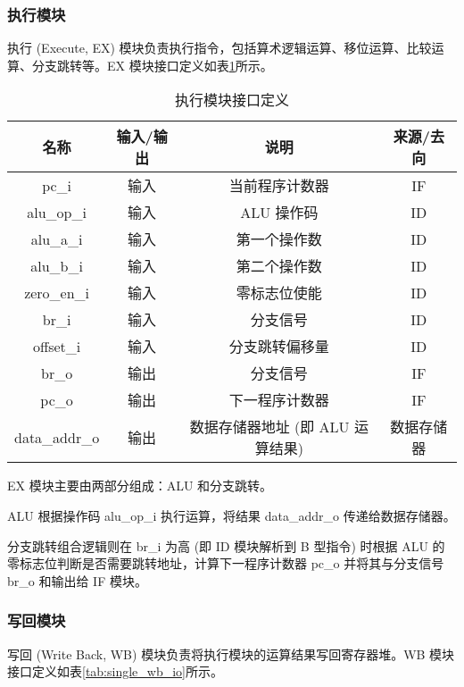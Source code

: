 \documentclass[lang=zh]{sjtuarticle}	%
\begin{document}
\subsubsection{执行模块}

执行 (Execute, EX) 模块负责执行指令，包括算术逻辑运算、移位运算、比较运算、分支跳转等。EX 模块接口定义如表\ref{tab:single_ex_io}所示。	

\begin{table}[!htp]
	\centering
	\caption{执行模块接口定义}
	\label{tab:single_ex_io}
	\begin{tabular}{|c|c|c|c|}
		\hline
		名称 & 输入/输出 & 说明 & 来源/去向 \\
		\hline
		pc\_i & 输入 & 当前程序计数器 & IF \\
		\hline
		alu\_op\_i & 输入 & ALU 操作码 & ID \\
		\hline
		alu\_a\_i & 输入 & 第一个操作数 & ID \\
		\hline
		alu\_b\_i & 输入 & 第二个操作数 & ID \\
		\hline
		zero\_en\_i & 输入 & 零标志位使能 & ID \\
		\hline
		br\_i & 输入 & 分支信号 & ID \\
		\hline
		offset\_i & 输入 & 分支跳转偏移量 & ID \\
		\hline
		br\_o & 输出 & 分支信号 & IF \\
		\hline
		pc\_o & 输出 & 下一程序计数器 & IF \\
		\hline
		data\_addr\_o & 输出 & 数据存储器地址 (即 ALU 运算结果) & 数据存储器 \\
		\hline
	\end{tabular}
\end{table}

EX 模块主要由两部分组成：ALU 和分支跳转。

ALU 根据操作码 alu\_op\_i 执行运算，将结果 data\_addr\_o 传递给数据存储器。

分支跳转组合逻辑则在 br\_i 为高 (即 ID 模块解析到 B 型指令) 时根据 ALU 的零标志位判断是否需要跳转地址，计算下一程序计数器 pc\_o 并将其与分支信号 br\_o 和输出给 IF 模块。

\subsubsection{写回模块}

写回 (Write Back, WB) 模块负责将执行模块的运算结果写回寄存器堆。WB 模块接口定义如表\ref{tab:single_wb_io}所示。
\end{document}
